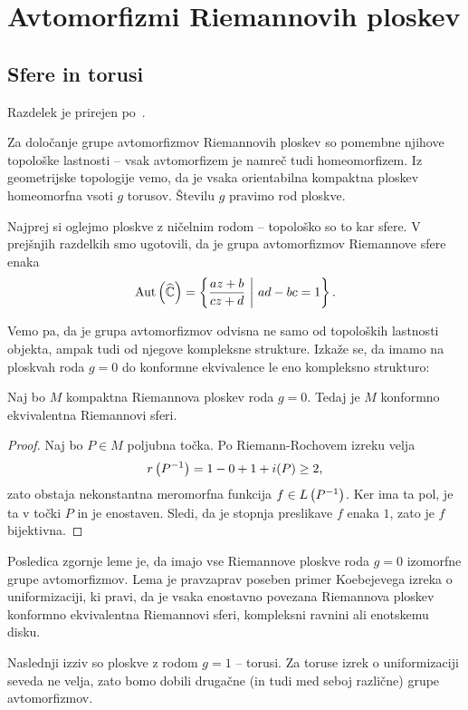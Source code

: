 \section{Avtomorfizmi Riemannovih ploskev}

\subsection{Sfere in torusi}

Razdelek je prirejen po~\cite{cerne}.

Za določanje grupe avtomorfizmov Riemannovih ploskev so pomembne
njihove topološke lastnosti -- vsak avtomorfizem je namreč tudi
homeomorfizem. Iz geometrijske topologije vemo, da je vsaka
orientabilna kompaktna ploskev homeomorfna vsoti $g$ torusov.
Številu $g$ pravimo rod ploskve.

Najprej si oglejmo ploskve z ničelnim rodom -- topološko so to kar
sfere. V prejšnjih razdelkih smo ugotovili, da je grupa
avtomorfizmov Riemannove sfere enaka
\[
\operatorname{Aut} \left(\widehat{\mathbb{C}}\right) = \left\{\frac{az + b}{cz + d}~\middle\vert~ad - bc = 1\right\}.
\]

Vemo pa, da je grupa avtomorfizmov odvisna ne samo od topoloških
lastnosti objekta, ampak tudi od njegove kompleksne strukture.
Izkaže se, da imamo na ploskvah roda $g = 0$ do konformne
ekvivalence le eno kompleksno strukturo:

\begin{lema}
Naj bo $M$ kompaktna Riemannova ploskev roda $g = 0$. Tedaj je $M$
konformno ekvivalentna Riemannovi sferi.
\end{lema}

\begin{proof}
Naj bo $P \in M$ poljubna točka. Po Riemann-Rochovem izreku velja
\[
r \left(P^{-1}\right) = 1 - 0 + 1 + i(P) \geq 2,
\]
zato obstaja nekonstantna meromorfna funkcija
$f \in L \left(P^{-1}\right)$. Ker ima ta pol, je ta v točki $P$ in je
enostaven. Sledi, da je stopnja preslikave $f$ enaka $1$, zato je
$f$ bijektivna.
\end{proof}

Posledica zgornje leme je, da imajo vse Riemannove ploskve roda
$g = 0$ izomorfne grupe avtomorfizmov. Lema je pravzaprav poseben
primer Koebejevega izreka o uniformizaciji, ki pravi, da je vsaka
enostavno povezana Riemannova ploskev konformno ekvivalentna
Riemannovi sferi, kompleksni ravnini ali enotskemu disku.

Naslednji izziv so ploskve z rodom $g=1$ -- torusi. Za toruse
izrek o uniformizaciji seveda ne velja, zato bomo dobili drugačne
(in tudi med seboj različne) grupe avtomorfizmov.

